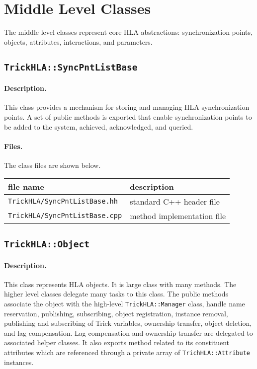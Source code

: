 \section{Middle Level Classes}

The middle level classes represent core HLA abstractions:
synchronization points,
objects, attributes, interactions, and parameters.

\subsection{{\tt TrickHLA::SyncPntListBase}}

\paragraph{Description.}
This class provides a mechanism for storing and managing HLA
synchronization points.
A set of public methods is exported that enable synchronization points
to be added to the system, achieved, acknowledged, and queried.

\paragraph{Files.}
The class files are shown below.
   
{
  \scriptsize
  \begin{tabular}{|l|l|} 
    \hline
    file name & description \\
    \hline \hline
    {\tt TrickHLA/SyncPntListBase.hh} 
    & standard C++ header file
    \\ \hline
    {\tt TrickHLA/SyncPntListBase.cpp} 
    & method implementation file
    \\ \hline
  \end{tabular}
}

\subsection{{\tt TrickHLA::Object}}

\paragraph{Description.}
This class represents HLA objects.
It is large class with many methods. 
The higher level classes delegate many tasks to this class.
The public methods associate the object with the high-level
{\tt TrickHLA::Manager} class, handle name reservation, publishing,
subscribing, object registration, instance removal,
publishing and subscribing of Trick variables,
ownership transfer, object deletion, and lag compensation.
Lag compensation and ownership transfer are delegated to associated
helper classes.
It also exports method related to its constituent attributes which are
referenced through a private array of {\tt TrichHLA::Attribute} instances.

